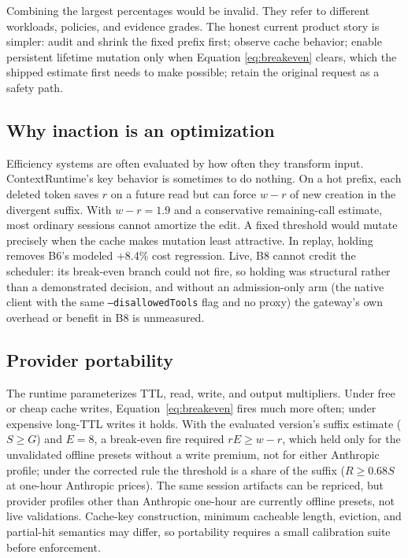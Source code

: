 \documentclass[10pt,twocolumn]{article}
\begin{document}
Combining the largest percentages would be invalid.  They refer to different workloads, policies, and
evidence grades.  The honest current product story is simpler: audit and shrink the fixed prefix
first; observe cache behavior; enable persistent lifetime mutation only when Equation
\ref{eq:breakeven} clears, which the shipped estimate first needs to make possible; retain the original
request as a safety path.

\subsection{Why inaction is an optimization}

Efficiency systems are often evaluated by how often they transform input.  ContextRuntime's key
behavior is sometimes to do nothing.  On a hot prefix, each deleted token saves $r$ on a future read
but can force $w-r$ of new creation in the divergent suffix.  With $w-r=1.9$ and a conservative
remaining-call estimate, most ordinary sessions cannot amortize the edit.  A fixed threshold would
mutate precisely when the cache makes mutation least attractive.  In replay, holding removes B6's
modeled +8.4\% cost regression.  Live, B8 cannot credit the scheduler: its break-even branch could not
fire, so holding was structural rather than a demonstrated decision, and without an admission-only
arm (the native client with the same \texttt{--disallowedTools} flag and no proxy) the gateway's own
overhead or benefit in B8 is unmeasured.

\subsection{Provider portability}

The runtime parameterizes TTL, read, write, and output multipliers.  Under free or cheap cache writes,
Equation~\ref{eq:breakeven} fires much more often; under expensive long-TTL writes it holds.  With the
evaluated version's suffix estimate ($S\ge G$) and $E=8$, a break-even fire required $rE\ge w-r$, which
held only for the unvalidated offline presets without a write premium, not for either Anthropic
profile; under the corrected rule the threshold is a share of the suffix ($R\ge0.68S$ at one-hour
Anthropic prices).  The same
session artifacts can be repriced, but provider profiles other than Anthropic one-hour are currently
offline presets, not live validations.  Cache-key construction, minimum cacheable length, eviction,
and partial-hit semantics may differ, so portability requires a small calibration suite before
enforcement.
\end{document}
